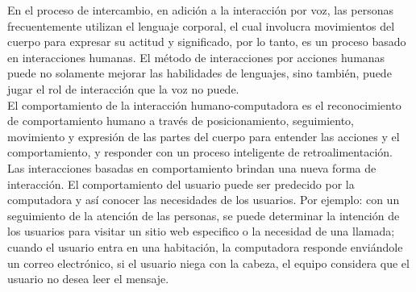 En el proceso de intercambio, en adición a la interacción por voz, las personas frecuentemente utilizan el lenguaje corporal, el cual involucra movimientos del cuerpo para expresar su actitud y significado, por lo tanto, es un proceso basado en interacciones humanas. El método de interacciones por acciones humanas puede no solamente mejorar las habilidades de lenguajes, sino también, puede jugar el rol de interacción que la voz no puede. \\

El comportamiento de la interacción humano-computadora es el reconocimiento de comportamiento humano a través de posicionamiento, seguimiento, movimiento y expresión de las partes del cuerpo para entender las acciones y el comportamiento, y responder con un proceso inteligente de retroalimentación. \\

Las interacciones basadas en comportamiento brindan una nueva forma de interacción. El comportamiento del usuario puede ser predecido por la computadora y así conocer las necesidades de los usuarios. Por ejemplo: con un seguimiento de la atención de las personas, se puede determinar la intención de los usuarios para visitar un sitio web especifico o la necesidad de una llamada; cuando el usuario entra en una habitación, la computadora responde enviándole un correo electrónico, si el usuario niega con la cabeza, el equipo considera que el usuario no desea leer el mensaje.